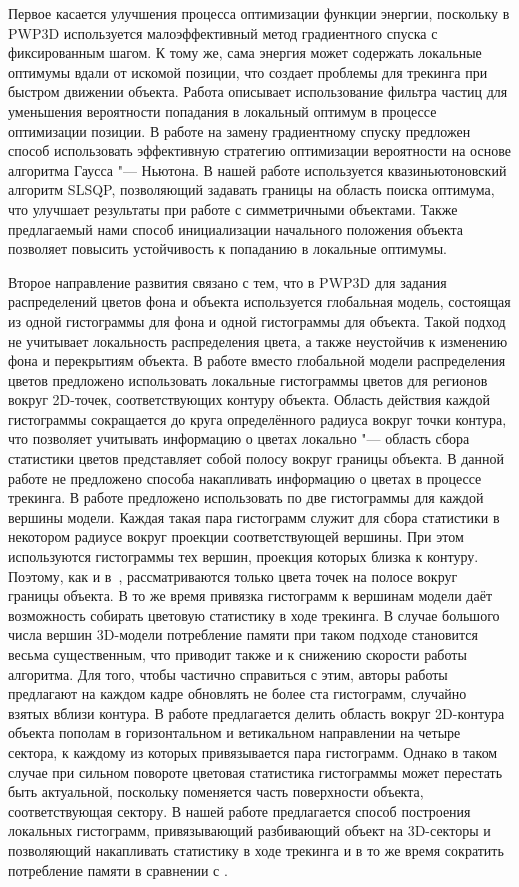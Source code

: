 Первое касается улучшения процесса оптимизации функции энергии, поскольку в
PWP3D используется малоэффективный метод градиентного спуска с фиксированным
шагом.
К тому же, сама энергия может содержать локальные оптимумы вдали от искомой
позиции, что создает проблемы для трекинга при быстром движении объекта.
Работа \cite{Zhao2014} описывает использование фильтра частиц для уменьшения
вероятности попадания в локальный оптимум в процессе оптимизации позиции.
В работе \cite{Tjaden2018} на замену градиентному спуску предложен способ
использовать эффективную стратегию оптимизации вероятности на основе алгоритма
Гаусса "--- Ньютона.
В нашей работе используется квазиньютоновский алгоритм SLSQP, позволяющий
задавать границы на область поиска оптимума, что улучшает результаты при работе
с симметричными объектами.
Также предлагаемый нами способ инициализации начального положения объекта
позволяет повысить устойчивость к попаданию в локальные оптимумы.

Второе направление развития связано с тем, что в PWP3D для задания
распределений цветов фона и объекта используется глобальная модель, состоящая
из одной гистограммы для фона и одной гистограммы для объекта.
Такой подход не учитывает локальность распределения цвета, а также неустойчив к
изменению фона и перекрытиям объекта.
В работе \cite{Hexner2016} вместо глобальной модели распределения цветов
предложено использовать локальные гистограммы цветов для регионов вокруг
2D-точек, соответствующих контуру объекта.
Область действия каждой гистограммы сокращается до круга определённого радиуса
вокруг точки контура, что позволяет учитывать информацию о цветах локально "---
область сбора статистики цветов представляет собой полосу вокруг границы
объекта.
В данной работе не предложено способа накапливать информацию о цветах в
процессе трекинга.
В работе \cite{Tjaden2017} предложено использовать по две гистограммы для
каждой вершины модели.
Каждая такая пара гистограмм служит для сбора статистики в некотором радиусе
вокруг проекции соответствующей вершины.
При этом используются гистограммы тех вершин, проекция которых близка к
контуру.
Поэтому, как и в~\cite{Hexner2016}, рассматриваются только цвета точек на
полосе вокруг границы объекта.
В то же время привязка гистограмм к вершинам модели даёт возможность собирать
цветовую статистику в ходе трекинга.
В случае большого числа вершин 3D-модели потребление памяти при таком подходе
становится весьма существенным, что приводит также и к снижению скорости работы
алгоритма.
Для того, чтобы частично справиться с этим, авторы работы \cite{Tjaden2017}
предлагают на каждом кадре обновлять не более ста гистограмм, случайно взятых
вблизи контура.
В работе \cite{Zhong2018} предлагается делить  область вокруг 2D-контура
объекта пополам в горизонтальном и ветикальном направлении на четыре сектора,
к каждому из которых привязывается пара гистограмм.
Однако в таком случае при сильном повороте цветовая статистика гистограммы
может перестать быть актуальной, поскольку поменяется часть поверхности
объекта, соответствующая сектору.
В нашей работе предлагается способ построения локальных гистограмм,
привязывающий разбивающий объект на 3D-секторы и позволяющий накапливать
статистику в ходе трекинга и в то же время сократить потребление памяти в
сравнении с \cite{Tjaden2017}.

